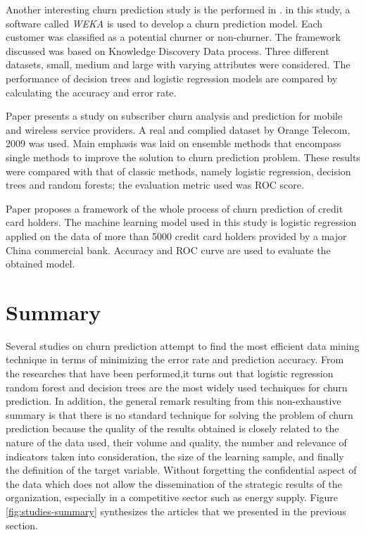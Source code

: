 \documentclass[LaM,binding=0.6cm, english]{sapthesis}
\begin{document}
\par Another interesting churn prediction study is the performed in \cite{Dahiya2015}. in this study, a software called \textit{WEKA} is used to develop a churn prediction model. Each customer was classified as a potential churner or non-churner. The framework discussed was based on Knowledge Discovery Data process. Three different datasets, small, medium and large with varying attributes were considered. The performance of decision trees and logistic regression models are compared by calculating the accuracy and error rate.

\par Paper \cite{Yabas2013} presents a study on subscriber churn analysis and prediction for mobile and wireless service providers. A real and complied dataset by Orange Telecom, 2009 was used. Main emphasis was laid on ensemble methods that encompass single methods to improve the solution to churn prediction problem. These results were compared with that of classic methods, namely logistic regression, decision trees and random forests; the evaluation metric used was ROC score.

\par Paper \cite{Nie2009} proposes a framework of the whole process of churn prediction of credit card holders. The machine learning model used in this study is logistic regression applied on the data of more than 5000 credit card holders provided by a major China commercial bank. Accuracy and ROC curve are used to evaluate the obtained model.

\section{Summary}

Several studies on churn prediction attempt to find the most efficient data mining technique in terms of minimizing the error rate and prediction accuracy. From the researches that have been performed,it turns out that logistic regression random forest and decision trees are the most widely used techniques for churn prediction. In addition, the general remark resulting from this non-exhaustive summary is that there is no standard technique for solving the problem of churn prediction because the quality of the results obtained is closely related to the nature of the data used, their volume and quality, the number and relevance of indicators taken into consideration, the size of the learning sample, and finally the definition of the target variable. Without forgetting the confidential aspect of the data which does not allow the dissemination of the strategic results of the organization, especially in a competitive sector such as energy supply. Figure \ref{fig:studies-summary} synthesizes the articles that we presented in the previous section.
\end{document}
